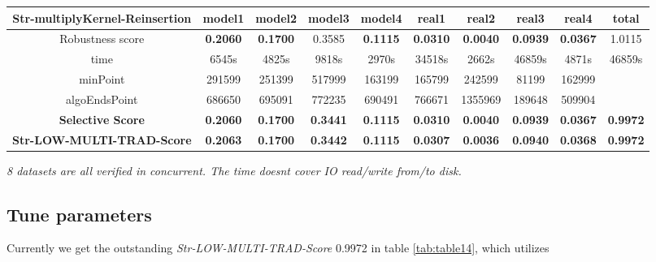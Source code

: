 \documentclass{article}
\begin{document}
\begin{table}[!htbp]
\begin{adjustwidth}{-3cm}{}
\begin{threeparttable}
\begin{tabular}{|c|c|c|c|c|c|c|c|c|c|}
				\textbf{Str-multiplyKernel-Reinsertion}         & \textbf{model1} & \textbf{model2} & \textbf{model3} & \textbf{model4} & \textbf{real1} & \textbf{real2} & \textbf{real3} & \textbf{real4} & \textbf{total} \\ \hline
				Robustness score                 & \textbf{0.2060}&\textbf{0.1700}&0.3585&\textbf{0.1115}&\textbf{0.0310}&\textbf{0.0040}&\textbf{0.0939}&\textbf{0.0367}&1.0115         \\ \hline
				time                             & 6545s&4825s&9818s&2970s&34518s&2662s&46859s&4871s&46859s         \\ \hline
				minPoint                         & 291599          & 251399          & 517999          & 163199          & 165799         & 242599         & 81199          & 162999         &                \\ \hline
				algoEndsPoint                    & 686650          & 695091          & 772235          & 690491          & 766671         & 1355969        & 189648         & 509904         &           \\ \hline \hline  
				\textbf{Selective Score}                 & \textbf{0.2060}&\textbf{0.1700}&\textbf{0.3441}&\textbf{0.1115}&\textbf{0.0310}&\textbf{0.0040}&\textbf{0.0939}&\textbf{0.0367}&\textbf{0.9972}    \\ \hline 			
				\textbf{Str-LOW-MULTI-TRAD-Score}                 & \textbf{0.2063}&\textbf{0.1700}&\textbf{0.3442}&\textbf{0.1115}&\textbf{0.0307}&\textbf{0.0036}&\textbf{0.0940}&\textbf{0.0368}&\textbf{0.9972}   \\ \hline 						
				
			\end{tabular}
			\begin{tablenotes}
				\small
				\item\textit{ 8 datasets are all verified in concurrent. The time doesn\textquotesingle t cover IO read/write from/to disk.}
			\end{tablenotes}			
		\end{threeparttable}
	\end{adjustwidth}	
	\end{table}			
		
			 
	 
	 
	 \subsection{Tune parameters}
	 
	 
	 Currently we get the outstanding \textit{Str-LOW-MULTI-TRAD-Score} 0.9972 in table \ref{tab:table14}, which utilizes 
	 
\end{document}
